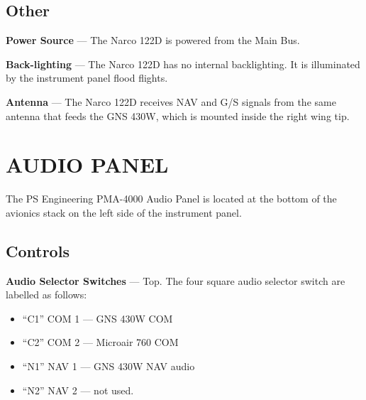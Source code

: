 \subsection*{Other}

\textbf{Power Source} --- The Narco 122D is powered from the Main Bus. 

\textbf{Back-lighting} --- The Narco 122D has no internal backlighting.  It is illuminated by the instrument panel flood flights.

\textbf{Antenna} --- The Narco 122D receives NAV and G/S signals from the same antenna that feeds the GNS 430W, which is mounted inside the right wing tip.

\clearpage 
\section{AUDIO PANEL} 

The PS Engineering PMA-4000 Audio Panel is located at the bottom of the avionics stack on the left side of the instrument panel.

\subsection*{Controls}

\textbf{Audio Selector Switches} --- Top. The four square audio selector switch are labelled as follows: 
\begin{itemize}
\item ``C1'' COM 1 --- GNS 430W COM 
\item ``C2'' COM 2 --- Microair 760 COM 
\item ``N1'' NAV 1 --- GNS 430W NAV audio 
\item ``N2'' NAV 2 --- not used. 
\end{itemize}

